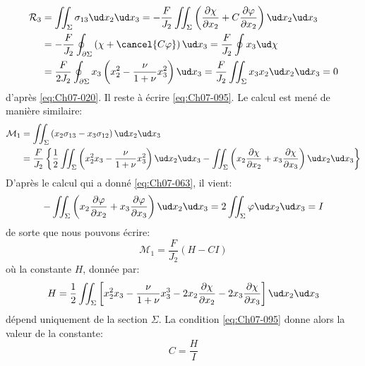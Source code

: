 \begin{equation}
    \begin{split}
        \mathcal{R}_3 &= \iint_{\Sigma} \sigma_{13} \ud x_2 \ud x_3 = - \frac{F}{J_2} \iint_{\Sigma} \left( \frac{\partial \chi}{\partial x_2} + C \frac{\partial \varphi}{\partial x_2} \right) \ud x_2 \ud x_3 \\
        &= - \frac{F}{J_2} \oint_{\partial \Sigma} \left( \chi + \cancel{C\varphi} \right) \ud x_3 = \frac{F}{J_2} \oint x_3 \ud \chi \\
        & = \frac{F}{2J_2} \oint_{\partial \Sigma} x_3 \left( x_2^2 - \frac{\nu}{1+\nu} x_3^2 \right) \ud x_3 = \frac{F}{J_2} \iint_{\Sigma} x_3 x_2 \ud x_2 \ud x_3 = 0
    \end{split}
    \label{eq:Ch07-113}
\end{equation}
d'après \eqref{eq:Ch07-020}. Il reste à écrire \eqref{eq:Ch07-095}. Le calcul est mené de manière similaire:
\begin{align*}
    \mathcal{M}_1 &= \iint_{\Sigma} \left( x_2 \sigma_{13} - x_3 \sigma_{12} \right) \ud x_2 \ud x_3 \\
    &= \frac{F}{J_2} \left\{ \frac{1}{2} \iint_{\Sigma} \left( x_2^2 x_3 - \frac{\nu}{1+\nu} x_3^2 \right) \ud x_2 \ud x_3 - \iint_{\Sigma} \left( x_2 \frac{\partial \chi}{\partial x_2} + x_3 \frac{\partial \chi}{\partial x_3}  \right)\ud x_2 \ud x_3 \right\}
\end{align*}
D'après le calcul qui a donné \eqref{eq:Ch07-063}, il vient: 
\begin{displaymath}
    -\iint_{\Sigma} \left( x_2 \frac{\partial \varphi}{\partial x_2} + x_3 \frac{\partial \varphi}{\partial x_3} \right) \ud x_2 \ud x_3 = 2 \iint_{\Sigma} \varphi \ud x_2 \ud x_3 = I
\end{displaymath}
de sorte que nous pouvons écrire: 
\begin{equation}
    \mathcal{M}_1 = \frac{F}{J_2} \left( H - CI \right)
    \label{eq:Ch07-114}
\end{equation}
où la constante $H$, donnée par:
\begin{equation}
    H = \frac{1}{2} \iint_{\Sigma} \left[ x_2^2 x_3 - \frac{\nu}{1+\nu} x_3^3 - 2x_2 \frac{\partial \chi}{\partial x_2} -2x_3 \frac{\partial \chi}{\partial x_3} \right] \ud x_2 \ud x_3
    \label{eq:Ch07-115}
\end{equation}
dépend uniquement de la section $\Sigma$.
La condition \eqref{eq:Ch07-095} donne alors la valeur de la constante: 
\begin{equation}
    C = \frac{H}{I}
    \label{eq:Ch07-116}
\end{equation}
